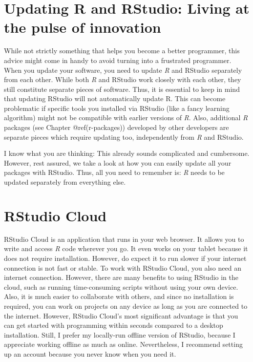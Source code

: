 \documentclass[
  letterpaper,
]{krantz}
\begin{document}
\section{Updating R and RStudio: Living at the pulse of
innovation}\label{updating-r-and-rstudio}

While not strictly something that helps you become a better programmer,
this advice might come in handy to avoid turning into a frustrated
programmer. When you update your software, you need to update \emph{R}
and RStudio separately from each other. While both \emph{R} and RStudio
work closely with each other, they still constitute separate pieces of
software. Thus, it is essential to keep in mind that updating RStudio
will not automatically update R. This can become problematic if specific
tools you installed via RStudio (like a fancy learning algorithm) might
not be compatible with earlier versions of \emph{R}. Also, additional
\emph{R} packages (see Chapter @ref(r-packages)) developed by other
developers are separate pieces which require updating too, independently
from \emph{R} and RStudio.

I know what you are thinking: This already sounds complicated and
cumbersome. However, rest assured, we take a look at how you can easily
update all your packages with RStudio. Thus, all you need to remember
is: \emph{R} needs to be updated separately from everything else.

\section{RStudio Cloud}\label{rstudio-cloud}

RStudio Cloud is an application that runs in your web browser. It allows
you to write and access \emph{R} code wherever you go. It even works on
your tablet because it does not require installation. However, do expect
it to run slower if your internet connection is not fast or stable. To
work with RStudio Cloud, you also need an internet connection. However,
there are many benefits to using RStudio in the cloud, such as running
time-consuming scripts without using your own device. Also, it is much
easier to collaborate with others, and since no installation is
required, you can work on projects on any device as long as you are
connected to the internet. However, RStudio Cloud's most significant
advantage is that you can get started with programming within seconds
compared to a desktop installation. Still, I prefer my locally-run
offline version of RStudio, because I appreciate working offline as much
as online. Nevertheless, I recommend setting up an account because you
never know when you need it.
\end{document}
